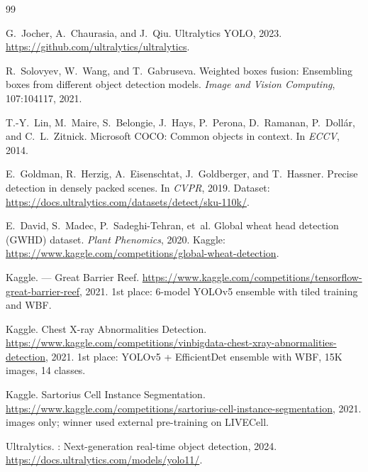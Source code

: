 \documentclass[11pt,a4paper]{article}
\begin{document}

\begin{thebibliography}{99}

G.~Jocher, A.~Chaurasia, and J.~Qiu.
\newblock Ultralytics {YOLO}, 2023.
\newblock \url{https://github.com/ultralytics/ultralytics}.

R.~Solovyev, W.~Wang, and T.~Gabruseva.
\newblock Weighted boxes fusion: Ensembling boxes from different object detection models.
\newblock \emph{Image and Vision Computing}, 107:104117, 2021.

T.-Y.~Lin, M.~Maire, S.~Belongie, J.~Hays, P.~Perona, D.~Ramanan, P.~Doll{\'a}r, and C.~L.~Zitnick.
\newblock Microsoft {COCO}: Common objects in context.
\newblock In \emph{ECCV}, 2014.

E.~Goldman, R.~Herzig, A.~Eisenschtat, J.~Goldberger, and T.~Hassner.
\newblock Precise detection in densely packed scenes.
\newblock In \emph{CVPR}, 2019.
\newblock Dataset: \url{https://docs.ultralytics.com/datasets/detect/sku-110k/}.

E.~David, S.~Madec, P.~Sadeghi-Tehran, et~al.
\newblock Global wheat head detection ({GWHD}) dataset.
\newblock \emph{Plant Phenomics}, 2020.
\newblock Kaggle: \url{https://www.kaggle.com/competitions/global-wheat-detection}.

Kaggle.
 --- Great Barrier Reef.
\newblock \url{https://www.kaggle.com/competitions/tensorflow-great-barrier-reef}, 2021.
\newblock 1st place: 6-model YOLOv5 ensemble with tiled training and WBF.

Kaggle.
 Chest X-ray Abnormalities Detection.
\newblock \url{https://www.kaggle.com/competitions/vinbigdata-chest-xray-abnormalities-detection}, 2021.
\newblock 1st place: YOLOv5 + EfficientDet ensemble with WBF, 15K images, 14 classes.

Kaggle.
\newblock Sartorius Cell Instance Segmentation.
\newblock \url{https://www.kaggle.com/competitions/sartorius-cell-instance-segmentation}, 2021.
 images only; winner used external pre-training on LIVECell.

Ultralytics.
: Next-generation real-time object detection, 2024.
\newblock \url{https://docs.ultralytics.com/models/yolo11/}.

\end{thebibliography}
\end{document}
